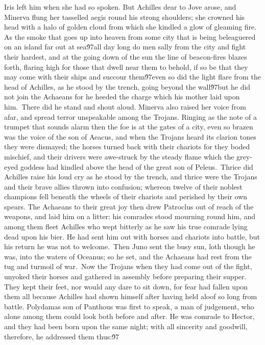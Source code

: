 {Iris left him when she had so spoken. But Achilles dear to Jove arose, and Minerva flung her tasselled aegis round his strong shoulders; she crowned his head with a halo of golden cloud from which she kindled a glow of gleaming fire. As the smoke that goes up into heaven from some city that is being beleaguered on an island far out at sea\'97all day long do men sally from the city and fight their hardest, and at the going down of the sun the line of beacon-fires blazes forth, flaring high for those that dwell near them to behold, if so be that they may come with their ships and succour them\'97even so did the light flare from the head of Achilles, as he stood by the trench, going beyond the wall\'97but he did not join the Achaeans for he heeded the charge which his mother laid upon him.\
There did he stand and shout aloud. Minerva also raised her voice from afar, and spread terror unspeakable among the Trojans. Ringing as the note of a trumpet that sounds alarm then the foe is at the gates of a city, even so brazen was the voice of the son of Aeacus, and when the Trojans heard its clarion tones they were dismayed; the horses turned back with their chariots for they boded mischief, and their drivers were awe-struck by the steady flame which the grey-eyed goddess had kindled above the head of the great son of Peleus.\
Thrice did Achilles raise his loud cry as he stood by the trench, and thrice were the Trojans and their brave allies thrown into confusion; whereon twelve of their noblest champions fell beneath the wheels of their chariots and perished by their own spears. The Achaeans to their great joy then drew Patroclus out of reach of the weapons, and laid him on a litter: his comrades stood mourning round him, and among them fleet Achilles who wept bitterly as he saw his true comrade lying dead upon his bier. He had sent him out with horses and chariots into battle, but his return he was not to welcome.\
Then Juno sent the busy sun, loth though he was, into the waters of Oceanus; so he set, and the Achaeans had rest from the tug and turmoil of war.\
Now the Trojans when they had come out of the fight, unyoked their horses and gathered in assembly before preparing their supper. They kept their feet, nor would any dare to sit down, for fear had fallen upon them all because Achilles had shown himself after having held aloof so long from battle. Polydamas son of Panthous was first to speak, a man of judgement, who alone among them could look both before and after. He was comrade to Hector, and they had been born upon the same night; with all sincerity and goodwill, therefore, he addressed them thus:\'97\
}
